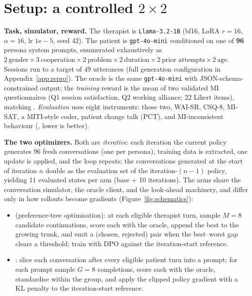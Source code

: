\section{Setup: a controlled $2 \times 2$}
\label{sec:setup}

\textbf{Task, simulator, reward.} The therapist is \texttt{Llama-3.2-1B} (bf16, LoRA $r{=}16$,
$\alpha{=}16$, lr $1\mathrm{e}{-}5$, seed 42). The patient is \texttt{gpt-4o-mini} conditioned on
one of \textbf{96} persona system prompts, enumerated exhaustively as $2\ \text{gender} \times
3\ \text{cooperation} \times 2\ \text{problem} \times 2\ \text{duration} \times 2\ \text{prior
attempts} \times 2\ \text{age}$. Sessions run to a target of 49 utterances (full generation
configuration in Appendix~\ref{app:repro}). The oracle is the same \texttt{gpt-4o-mini} with
JSON-schema-constrained output; the \emph{training} reward is the mean of two validated MI
questionnaires (Q1 session satisfaction, Q2 working alliance; 22 Likert items), matching
\citet{baruch2025pto}. \emph{Evaluation} uses eight instruments: those two, WAI-SR, CSQ-8,
MI-SAT, a MITI-style coder, patient change talk (PCT), and MI-inconsistent behaviour (\mici,
lower is better).

\textbf{The two optimizers.} Both are \emph{iterative}: each iteration the current policy
generates 96 fresh conversations (one per persona), training data is extracted, one update is
applied, and the loop repeats; the conversations generated at the start of iteration $n$ double
as the evaluation set of the iteration-$(n{-}1)$ policy, yielding 11 evaluated states per arm
(base + 10 iterations). The arms share the conversation simulator, the oracle client, and the
look-ahead machinery, and differ only in how rollouts become gradients
(Figure~\ref{fig:schematics}):
\begin{itemize}
\item \textbf{\PTO} (preference-tree optimisation): at each eligible therapist turn, sample
$M{=}8$ candidate continuations, score each with the oracle, append the best to the growing
trunk, and emit a (chosen, rejected) pair when the best--worst gap clears a threshold; train
with DPO against the iteration-start reference.
\item \textbf{\GRPO}: slice each conversation after every eligible patient turn into a prompt;
for each prompt sample $G{=}8$ completions, score each with the oracle, standardise within the
group, and apply the clipped policy gradient with a KL penalty to the iteration-start reference.
\end{itemize}

